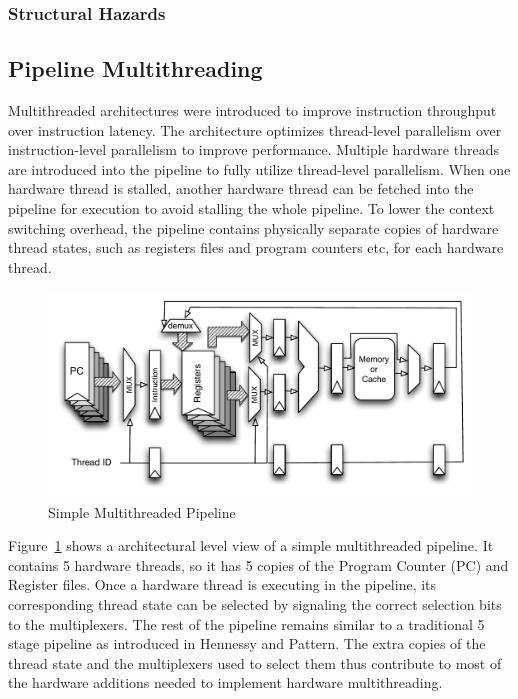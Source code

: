 \subsubsection{Structural Hazards}

\subsection{Pipeline Multithreading}
 Multithreaded architectures were introduced to improve instruction throughput over instruction latency.
The architecture optimizes thread-level parallelism over instruction-level parallelism to improve performance.
Multiple hardware threads are introduced into the pipeline to fully utilize thread-level parallelism. 
When one hardware thread is stalled, another hardware thread can be fetched into the pipeline for execution to avoid stalling the whole pipeline. 
To lower the context switching overhead, the pipeline contains physically separate copies of hardware thread states, such as registers files and program counters etc, for each hardware thread.
\begin{figure}
\begin{center}
\includegraphics[scale=.8]{figs/multithreaded_pipeline_block}
\end{center}
\vspace{-30pt}
\caption{Simple Multithreaded Pipeline}
\label{fig:multi-thread pipeline simplified}
\end{figure}
Figure~\ref{fig:multi-thread pipeline simplified} shows a architectural level view of a simple multithreaded pipeline.
It contains 5 hardware threads, so it has 5 copies of the Program Counter (PC) and Register files.
Once a hardware thread is executing in the pipeline, its corresponding thread state can be selected by signaling the correct selection bits to the multiplexers.
The rest of the pipeline remains similar to a traditional 5 stage pipeline as introduced in Hennessy and Pattern.   
The extra copies of the thread state and the multiplexers used to select them thus contribute to most of the hardware additions needed to implement hardware multithreading.

